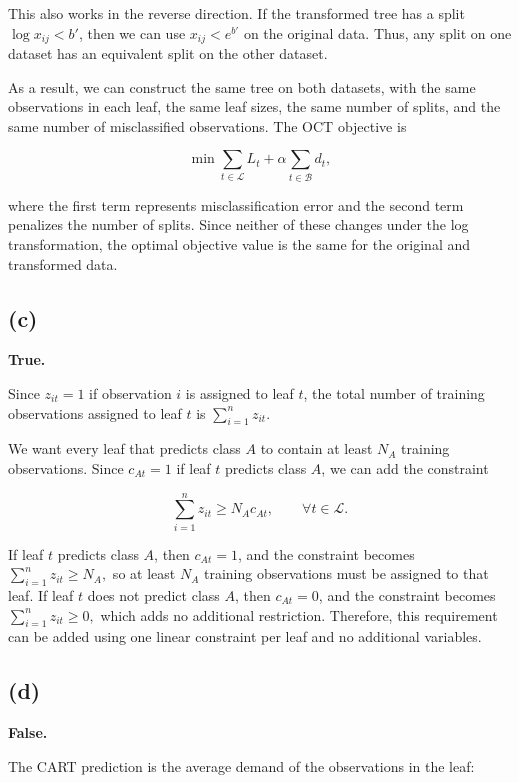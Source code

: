 \documentclass{article}
\begin{document}
This also works in the reverse direction. If the transformed tree has a split $\log x_{ij}<b'$, then we can use $
x_{ij}<e^{b'}
$ on the original data. Thus, any split on one dataset has an equivalent split on the other dataset.

As a result, we can construct the same tree on both datasets, with the same observations in each leaf, the same leaf sizes, the same number of splits, and the same number of misclassified observations. The OCT objective is

$$
\min \sum_{t\in\mathcal{L}} L_t
+
\alpha \sum_{t\in\mathcal{B}} d_t,
$$

where the first term represents misclassification error and the second term penalizes the number of splits. Since neither of these changes under the log transformation, the optimal objective value is the same for the original and transformed data.


\newpage
\subsection*{(c)}

\textbf{True.}

Since $z_{it}=1$ if observation $i$ is assigned to leaf $t$, the total number of training observations assigned to leaf $t$ is $
\sum_{i=1}^{n} z_{it}.
$

We want every leaf that predicts class $A$ to contain at least $N_A$ training observations. Since $c_{At}=1$ if leaf $t$ predicts class $A$, we can add the constraint

$$
\sum_{i=1}^{n} z_{it} \geq N_A c_{At},
\qquad \forall t \in \mathcal{L}.
$$

If leaf $t$ predicts class $A$, then $c_{At}=1$, and the constraint becomes $
\sum_{i=1}^{n} z_{it} \geq N_A,
$ so at least $N_A$ training observations must be assigned to that leaf. If leaf $t$ does not predict class $A$, then $c_{At}=0$, and the constraint becomes $
\sum_{i=1}^{n} z_{it} \geq 0,
$ which adds no additional restriction. Therefore, this requirement can be added using one linear constraint per leaf and no additional variables.


\vspace{5mm}
\subsection*{(d)}

\textbf{False.}

The CART prediction is the average demand of the observations in the leaf:
\end{document}
